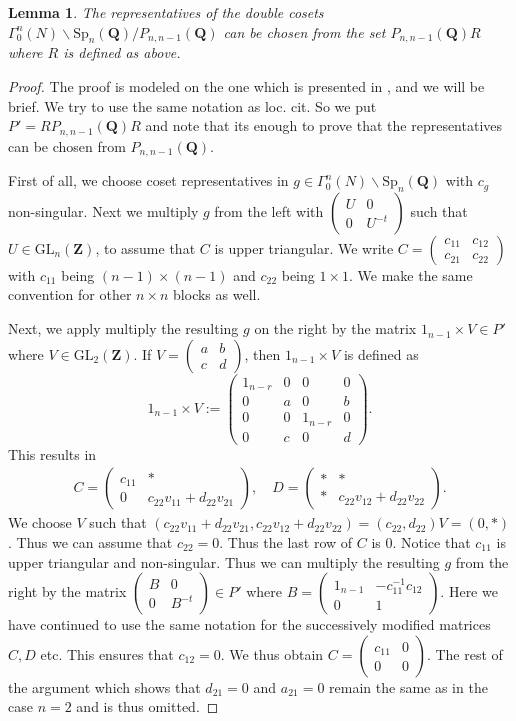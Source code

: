 \documentclass[12pt]{amsart}
\numberwithin{equation}{section}
\theoremstyle{plain}
\newtheorem{lem}[thm]{Lemma}
\theoremstyle{definition}
\newcommand*{\Q}{\mathbf{Q}}
\newcommand{\z}{\mf Z}
\newcommand{\mf}{\mathbf}
\newcommand{\q}{\quad}
\newcommand{\mrm}{\mathrm}
\newcommand{\glnz}{\mrm{GL}_n( \mf Z)}
\newcommand{\psmb}{\left( \begin{smallmatrix}}
\newcommand{\psme}{ \end{smallmatrix} \right) }
\begin{document}
\begin{lem} \label{pnn-1}
    The representatives of the double cosets $\Gamma^n_0(N) \backslash \mrm{Sp}_n(\Q)/ P_{n,n-1}(\Q)$ can be chosen from the set $P_{n,n-1}(\Q)R$ where $R$ is defined as above.
\end{lem}

\begin{proof}
The proof is modeled on the one which is presented in \cite[Lemma~3.4]{Ibu-SK}, and we will be brief. We try to use the same notation as loc. cit. So we put $P'=RP_{n,n-1}(\Q)R$ and note that its enough to prove that the representatives can be chosen from $P_{n,n-1}(\Q)$.

First of all, we choose coset representatives in $g \in \Gamma^n_0(N) \backslash \mrm{Sp}_n(\Q)$ with $c_g$ non-singular. Next we multiply $g$ from the left with $\psmb U & 0 \\ 0 & U^{-t} \psme$ such that $U \in \glnz$, to assume that $C$ is upper triangular. We write $C= \psmb c_{11} & c_{12} \\ c_{21} & c_{22} \psme$ with $c_{11}$ being $(n-1) \times (n-1)$ and $c_{22}$ being $1\times 1$. We make the same convention for other $n \times n$ blocks as well.

Next, we apply multiply the resulting $g$ on the right by the matrix $1_{n-1} \times V \in P'$ where $V \in \mrm{GL}_2(\z)$. If $\displaystyle V=\psmb a & b\\c & d \psme$, then $1_{n-1} \times V$ is defined as
\[
1_{n-1} \times V :=\begin{pmatrix}
            1_{n-r}&0&0&0\\
            0&a&0&b\\
            0&0&1_{n-r}&0\\
            0&c&0&d
    \end{pmatrix}.
    \]
This results in 
\begin{align}
    C= \begin{pmatrix}
        c_{11} & * \\ 0 & c_{22} v_{11} + d_{22} v_{21} \end{pmatrix} , \q D= \begin{pmatrix}  * & * \\ * & c_{22} v_{12} + d_{22} v_{22} \end{pmatrix} .
\end{align}
We choose $V$ such that $(c_{22} v_{11} + d_{22} v_{21}, c_{22} v_{12} + d_{22} v_{22}) = (c_{22}, d_{22})V=(0,*)$. Thus we can assume that $c_{22}=0$. Thus the last row of $C$ is $0$.
Notice that $c_{11}$ is upper triangular and non-singular. Thus we can multiply the resulting $g$ from the right by the matrix $\psmb B & 0 \\ 0 & B^{-t} \psme \in P' $
where $\displaystyle B= \psmb 1_{n-1}  & - c_{11}^{-1}c_{12} \\ 0 & 1 \psme$. Here we have continued to use the same notation for the successively modified matrices $C,D$ etc. This ensures that $c_{12}=0$. We thus obtain $C= \psmb c_{11} & 0 \\ 0 & 0\psme$. The rest of the argument which shows that $d_{21}=0$ and $a_{21}=0$ remain the same as in the case $n=2$ and is thus omitted.
\end{proof}
\end{document}
